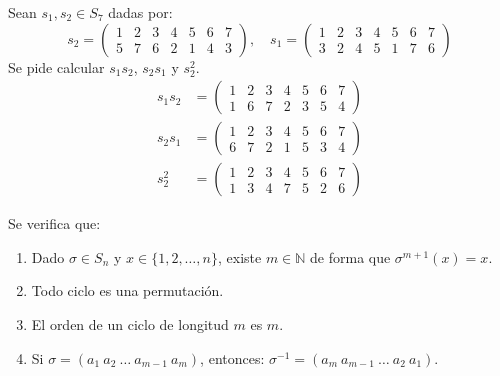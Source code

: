 \begin{ejemplo}
    Sean $s_1,s_2\in S_7$ dadas por:
    \begin{equation*}
        s_2 = \left(\begin{array}{ccccccc}
                1 & 2 & 3 & 4 & 5 & 6 & 7 \\
                5 & 7 & 6 & 2 & 1 & 4 & 3
        \end{array}\right), \quad s_1 = \left(\begin{array}{ccccccc}
                1 & 2 & 3 & 4 & 5 & 6 & 7 \\
                3 & 2 & 4 & 5 & 1 & 7 & 6
        \end{array}\right)
    \end{equation*}
    Se pide calcular $s_1s_2$, $s_2s_1$ y $s_2^2$.
    \begin{align*}
        s_1s_2 &= \left(\begin{array}{ccccccc}
                1 & 2 & 3 & 4 & 5 & 6 & 7 \\
                1 & 6 & 7 & 2 & 3 & 5 & 4
        \end{array}\right) \\
        s_2s_1 &= \left(\begin{array}{ccccccc}
                1 & 2 & 3 & 4 & 5 & 6 & 7 \\
                6 & 7 & 2 & 1 & 5 & 3 & 4
        \end{array}\right) \\
        s_2^2 &= \left(\begin{array}{ccccccc}
                1 & 2 & 3 & 4 & 5 & 6 & 7 \\
                1 & 3 & 4 & 7 & 5 & 2 & 6
        \end{array}\right)
    \end{align*}
\end{ejemplo}

\begin{prop}\label{prop:propiedades_sn}
    Se verifica que:
    \begin{enumerate}
        \item Dado $\sigma\in S_n$ y $x\in \{1,2,\ldots,n\}$, existe $m\in \mathbb{N}$ de forma que $\sigma^{m+1}(x)=x$.
        \item Todo ciclo es una permutación.
        \item El orden de un ciclo de longitud $m$ es $m$.
        \item Si $\sigma = (a_1\ a_2\ \ldots\ a_{m-1}\ a_m)$, entonces: $\sigma^{-1} = (a_m\ a_{m-1}\ \ldots\ a_2\ a_1)$.
    \end{enumerate}
\end{prop}

